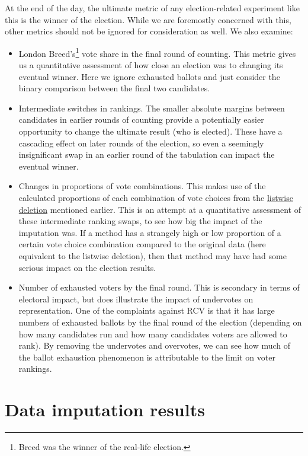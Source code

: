 \documentclass[12pt,twoside]{reedthesis}
\begin{document}
At the end of the day, the ultimate metric of any election-related experiment like this is the winner of the election. While we are foremostly concerned with this, other metrics should not be ignored for consideration as well. We also examine:
\begin{itemize}
\item
  London Breed's\footnote{Breed was the winner of the real-life election.} vote share in the final round of counting. This metric gives us a quantitative assessment of how close an election was to changing its eventual winner. Here we ignore exhausted ballots and just consider the binary comparison between the final two candidates.
\item
  Intermediate switches in rankings. The smaller absolute margins between candidates in earlier rounds of counting provide a potentially easier opportunity to change the ultimate result (who is elected). These have a cascading effect on later rounds of the election, so even a seemingly insignificant swap in an earlier round of the tabulation can impact the eventual winner.
\item
  Changes in proportions of vote combinations. This makes use of the calculated proportions of each combination of vote choices from the \protect\hyperlink{imp-methods}{listwise deletion} mentioned earlier. This is an attempt at a quantitative assessment of these intermediate ranking swaps, to see how big the impact of the imputation was. If a method has a strangely high or low proportion of a certain vote choice combination compared to the original data (here equivalent to the listwise deletion), then that method may have had some serious impact on the election results.
\item
  Number of exhausted voters by the final round. This is secondary in terms of electoral impact, but does illustrate the impact of undervotes on representation. One of the complaints against RCV is that it has large numbers of exhausted ballots by the final round of the election (depending on how many candidates run and how many candidates voters are allowed to rank). By removing the undervotes and overvotes, we can see how much of the ballot exhaustion phenomenon is attributable to the limit on voter rankings.
\end{itemize}
\hypertarget{missing-results}{%
\chapter{Data imputation results}\label{missing-results}}
\end{document}
